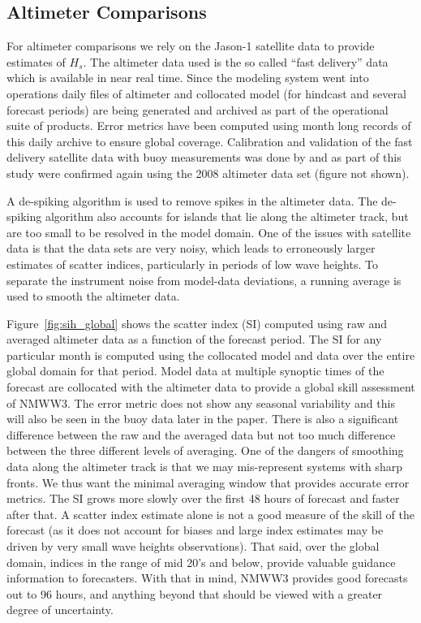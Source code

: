 \documentclass[12pt]{article}
\begin{document}
\subsection{Altimeter Comparisons}

For altimeter comparisons we rely on the Jason-1 satellite data to
provide estimates of $H_s$. The altimeter data used is the so called
``fast delivery'' data which is available in near real time. Since the
modeling system went into operations daily files of altimeter and
collocated model (for hindcast and several forecast periods) are being
generated and archived as part of the operational suite of
products. Error metrics have been computed using month long records of
this daily archive to ensure global coverage. Calibration and
validation of the fast delivery satellite data with buoy measurements
was done by \cite{tolmanetal-06} and as part of this study were
confirmed again using the 2008 altimeter data set (figure not shown).

A de-spiking algorithm is used to remove spikes in the altimeter
data. The de-spiking algorithm also accounts for islands that lie
along the altimeter track, but are too small to be resolved in the
model domain. One of the issues with satellite data is that the data
sets are very noisy, which leads to erroneously larger estimates of
scatter indices, particularly in periods of low wave heights. To
separate the instrument noise from model-data deviations, a running
average is used to smooth the altimeter data.

Figure~\ref{fig:sih_global} shows the scatter index (SI) computed
using raw and averaged altimeter data as a function of the forecast
period. The SI for any particular month is computed using the
collocated model and data over the entire global domain for that
period. Model data at multiple synoptic times of the forecast are
collocated with the altimeter data to provide a global skill
assessment of NMWW3. The error metric does not show any seasonal
variability and this will also be seen in the buoy data later in the
paper. There is also a significant difference between the raw and the
averaged data but not too much difference between the three different
levels of averaging. One of the dangers of smoothing data along the
altimeter track is that we may mis-represent systems with sharp
fronts. We thus want the minimal averaging window that provides
accurate error metrics. The SI grows more slowly over the first 48
hours of forecast and faster after that. A scatter index estimate
alone is not a good measure of the skill of the forecast (as it does
not account for biases and large index estimates may be driven by very
small wave heights observations). That said, over the global domain,
indices in the range of mid 20's and below, provide valuable guidance
information to forecasters. With that in mind, NMWW3 provides
good forecasts out to 96 hours, and anything beyond that should be
viewed with a greater degree of uncertainty.
\end{document}
